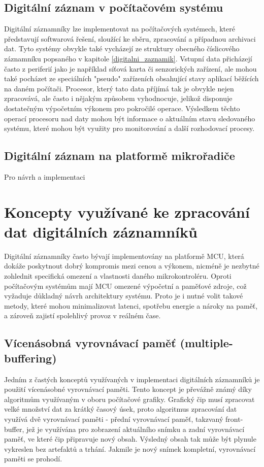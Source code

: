 \subsection{Digitální záznam v počítačovém systému}
Digitální záznamníky lze implementovat na počítačových systémech, které představují softwarová řešení, sloužící ke sběru, 
zpracování a případnou archivaci dat. Tyto systémy obvykle také vycházejí ze struktury obecného číslicového záznamníku popsaného 
v kapitole \ref{digitalni_zaznamik}. Vstupní data přicházejí často z periferií jako je například síťová karta či senzorických 
zařízení, ale mohou také pocházet ze speciálních "pseudo" zařízeních obsahující stavy aplikací běžících na daném počítači. 
Procesor, který tato data příjímá tak je obvykle nejen zpracovává, ale často i nějakým způsobem vyhodnocuje, jelikož disponuje 
dostatečným výpočetním výkonem pro pokročilé operace. Výsledkem těchto operací procesoru nad daty mohou být informace o aktuálním 
stavu sledovaného systému, které mohou být využity pro monitorování a další rozhodovací procesy. 
\cite{linux_in_action_log_and_monitoring}

\subsection{Digitální záznam na platformě mikrořadiče}
Pro návrh a implementaci 

\section{Koncepty využívané ke zpracování dat digitálních záznamníků} 
Digitální záznamníky často bývají implementovány na platformě MCU, která dokáže poskytnout dobrý kompromis mezi cenou a výkonem, 
nicméně je nezbytné zohlednit specifická omezení a vlastnosti daného mikrokontroléru. Oproti počítačovým systémům mají MCU omezené 
výpočetní a paměťové zdroje, což vyžaduje důkladný návrh architektury systému. Proto je i nutné volit takové metody, které mohou 
minimalizovat latenci, spotřebu energie a nároky na paměť, a zároveň zajistí spolehlivý provoz v reálném čase.

\subsection{Vícenásobná vyrovnávací paměť (multiple-buffering)}
Jedním z častých konceptů využívaných v implementaci digitálních záznamníků je použití vícenásobné vyrovnávací paměti. Tento 
koncept je převážně známý díky algoritmům využívaným v oboru počítačové grafiky. Grafický čip musí zpracovat velké množství dat 
za krátký časový úsek, proto algoritmus zpracování dat využívá dvě vyrovnávací paměti - přední vyrovnávací paměť, takzvaný 
front-buffer, jež je využívána pro zobrazení aktuálního snímku a zadní vyrovnávací paměť, ve které čip připravuje nový obsah. 
Výsledný obsah tak může být plynule vykreslen bez artefaktů a trhání. Jakmile je nový snímek kompletní, vyrovnávací paměti se 
prohodí. \cite{double_buffering_model}

